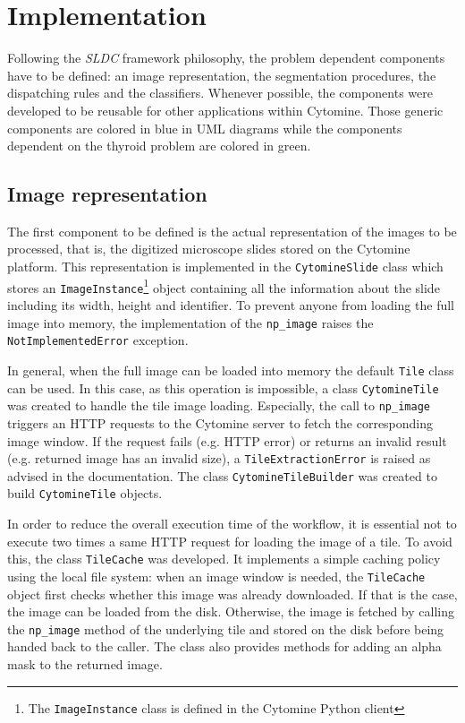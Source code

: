 \section{Implementation}
\label{sec:thyroid_implementation}
Following the \textit{SLDC} framework philosophy, the problem dependent components have to be defined: an image representation, the segmentation procedures, the dispatching rules and the classifiers. Whenever possible, the components were developed to be reusable for other applications within Cytomine. Those generic components are colored in blue in UML diagrams while the components dependent on the thyroid problem are colored in green.

\subsection{Image representation}

The first component to be defined is the actual representation of the images to be processed, that is, the digitized microscope slides stored on the Cytomine platform. This representation is implemented in the \texttt{CytomineSlide} class which stores an \texttt{ImageInstance}\footnote{The \texttt{ImageInstance} class is defined in the Cytomine Python client} object containing all the information about the slide including its width, height and identifier. To prevent anyone from loading the full image into memory, the implementation of the \texttt{np\_image} raises the \texttt{NotImplementedError} exception. 

In general, when the full image can be loaded into memory the default \texttt{Tile} class can be used. In this case, as this operation is impossible, a class \texttt{CytomineTile} was created to handle the tile image loading. Especially, the call to \texttt{np\_image} triggers an HTTP requests to the Cytomine server to fetch the corresponding image window. If the request fails (e.g. HTTP error) or returns an invalid result (e.g. returned image has an invalid size), a \texttt{TileExtractionError} is raised as advised in the documentation. The class \texttt{CytomineTileBuilder} was created to build \texttt{CytomineTile} objects.

In order to reduce the overall execution time of the workflow, it is essential not to execute two times a same HTTP request for loading the image of a tile. To avoid this, the class \texttt{TileCache} was developed. It implements a simple caching policy using the local file system: when an image window is needed, the \texttt{TileCache} object first checks whether this image was already downloaded. If that is the case, the image can be loaded from the disk. Otherwise, the image is fetched by calling the \texttt{np\_image} method of the underlying tile and stored on the disk before being handed back to the caller. The class also provides methods for adding an alpha mask to the returned image. 

